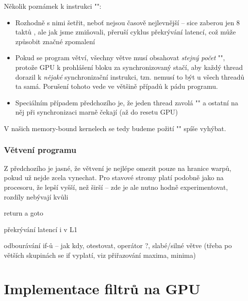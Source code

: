        Několik poznámek k instrukci \Vr"":
        \begin{itemize}
          \item Rozhodně s nimi šetřit, neboť nejsou časově nejlevnější -- sice zaberou jen 8 taktů \cite{CUDA programming g.}, ale jak jsme zmiňovali, přeruší cyklus překrývání latencí, což může způsobit značné zpomalení
          \item Pokud se program větví, všechny větve musí obsahovat \emph{stejný počet} \Vr"", protože GPU k prohlášení bloku za synchronizovaný stačí, aby každý thread dorazil k \emph{nějaké} synchronizační instrukci, tzn. nemusí to být u všech threadů ta samá. Porušení tohoto vede ve většině případů k pádu programu.
          \item Speciálním případem předchozího je, že jeden thread zavolá \Vr"" a ostatní na něj při synchronizaci marně čekají (až do resetu GPU)
        \end{itemize}
        V našich memory-bound kernelech se tedy budeme požití \Vr"" spíše vyhýbat.
        
        \subsubsection{Větvení programu}
        
        Z předchozího je jasné, že větvení je nejlépe omezit pouze na hranice warpů, pokud už nejde zcela vynechat. Pro stavové stromy platí podobně jako na procesoru, že lepší vyšší, než širší -- zde je ale nutno hodně experimentovat, rozdíly nebývají kvůli  
    
return a goto

překrývání latencí i v L1

odbourávání if-ů -- jak kdy, otestovat, operátor ?,
slabé/silné větve (třeba po větších skupinách se if vyplatí,
viz přiřazování maxima, minima) 

\section{Implementace filtrů na GPU}
